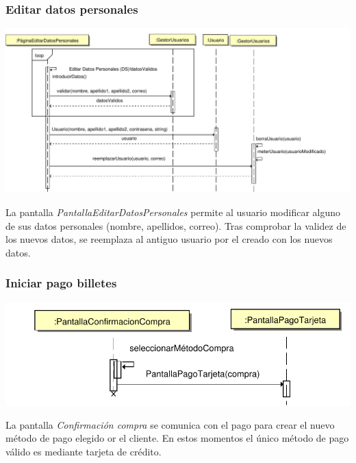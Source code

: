 \documentclass[11pt, a4paper, twoside, titlepage]{article}
\begin{document}
			\subsubsection{Editar datos personales}
				\begin{center}
					\includegraphics[scale=.6]{diseno/diagramas/editardatospersonales.pdf}
				\end{center}
				
				La pantalla {\itshape PantallaEditarDatosPersonales} permite al usuario modificar alguno de sus datos personales (nombre, apellidos, correo). Tras comprobar la validez de los nuevos datos, se reemplaza al antiguo usuario por el creado con los nuevos datos.
				

			\subsubsection{Iniciar pago billetes}
				\begin{center}
					\includegraphics[scale=.6]{diseno/diagramas/iniciarpagobilletes.pdf}
				\end{center}
				La pantalla {\itshape Confirmación compra} se comunica con el pago para crear el nuevo método de pago elegido or el cliente. En estos momentos el único método de pago válido es mediante tarjeta de crédito.
				
\end{document}
